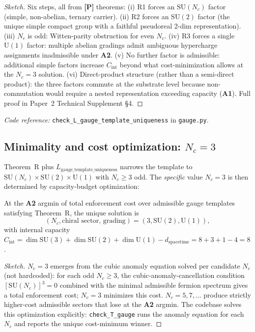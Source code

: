 \documentclass[11pt]{article}
\newcommand{\coderef}[2]{\smallskip\noindent\textit{Code reference:} \texttt{#1} in \texttt{#2}.}
\newcommand{\SU}{\mathrm{SU}}
\newcommand{\Un}{\mathrm{U}}
\newcommand{\epitag}[1]{\textbf{[#1]}}
\newcommand{\Aone}{\textbf{A1}}
\newcommand{\Atwo}{\textbf{A2}}
\theoremstyle{definition}
\begin{document}
\begin{proof}[Sketch]
Six steps, all from \epitag{P} theorems: (i) R1 forces an $\SU(N_c)$ factor (simple, non-abelian, ternary carrier). (ii) R2 forces an $\SU(2)$ factor (the unique simple compact group with a faithful pseudoreal 2-dim representation). (iii) $N_c$ is odd: Witten-parity obstruction for even $N_c$. (iv) R3 forces a single $\Un(1)$ factor: multiple abelian gradings admit ambiguous hypercharge assignments inadmissible under \Atwo{}. (v) No further factor is admissible: additional simple factors increase $C_{\mathrm{int}}$ beyond what cost-minimization allows at the $N_c = 3$ solution. (vi) Direct-product structure (rather than a semi-direct product): the three factors commute at the substrate level because non-commutation would require a nested representation exceeding capacity (\Aone{}). Full proof in Paper~2 Technical Supplement \S4.
\end{proof}

\coderef{check\_L\_gauge\_template\_uniqueness}{gauge.py}

\subsection{Minimality and cost optimization: \texorpdfstring{$N_c = 3$}{Nc = 3}}\label{sec:gauge_template_minimality}

Theorem~R plus $L_{\mathrm{gauge\_template\_uniqueness}}$ narrows the template to $\SU(N_c)\times\SU(2)\times\Un(1)$ with $N_c \geq 3$ odd. The \emph{specific} value $N_c = 3$ is then determined by capacity-budget optimization:

\begin{tcolorbox}[apfbox, title={$T_{\mathrm{gauge}}$ (SU(3)$\times$SU(2)$\times$U(1) by cost optimization) \epitag{P}}]
At the \Atwo{} argmin of total enforcement cost over admissible gauge templates satisfying Theorem~R, the unique solution is
\[
(N_c, \text{chiral sector, grading}) = (3, \SU(2), \Un(1)),
\]
with internal capacity $C_{\mathrm{int}} = \dim \SU(3) + \dim \SU(2) + \dim \Un(1) - d_{\mathrm{spacetime}} = 8 + 3 + 1 - 4 = 8$.
\end{tcolorbox}

\begin{proof}[Sketch]
$N_c = 3$ emerges from the cubic anomaly equation solved per candidate $N_c$ (not hardcoded): for each odd $N_c \geq 3$, the cubic-anomaly-cancellation condition $[\SU(N_c)]^3 = 0$ combined with the minimal admissible fermion spectrum gives a total enforcement cost; $N_c = 3$ minimizes this cost. $N_c = 5, 7, \ldots$ produce strictly higher-cost admissible sectors that lose at the \Atwo{} argmin. The codebase solves this optimization explicitly: \texttt{check\_T\_gauge} runs the anomaly equation for each $N_c$ and reports the unique cost-minimum winner.
\end{proof}
\end{document}
